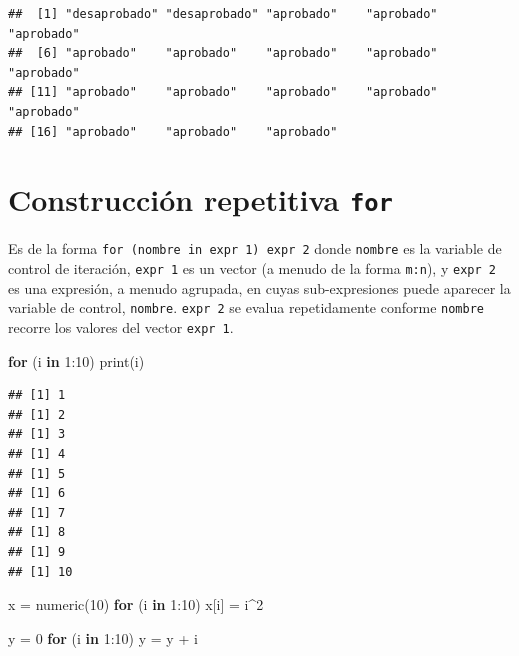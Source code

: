 \documentclass[
]{book}
\newenvironment{Shaded}{\begin{snugshade}}{\end{snugshade}}
\newcommand{\ControlFlowTok}[1]{\textcolor[rgb]{0.13,0.29,0.53}{\textbf{#1}}}
\newcommand{\DecValTok}[1]{\textcolor[rgb]{0.00,0.00,0.81}{#1}}
\newcommand{\FunctionTok}[1]{\textcolor[rgb]{0.00,0.00,0.00}{#1}}
\newcommand{\NormalTok}[1]{#1}
\newcommand{\OtherTok}[1]{\textcolor[rgb]{0.56,0.35,0.01}{#1}}
\newcommand{\SpecialCharTok}[1]{\textcolor[rgb]{0.00,0.00,0.00}{#1}}
\begin{document}
\begin{verbatim}
##  [1] "desaprobado" "desaprobado" "aprobado"    "aprobado"    "aprobado"   
##  [6] "aprobado"    "aprobado"    "aprobado"    "aprobado"    "aprobado"   
## [11] "aprobado"    "aprobado"    "aprobado"    "aprobado"    "aprobado"   
## [16] "aprobado"    "aprobado"    "aprobado"
\end{verbatim}

\hypertarget{construcciuxf3n-repetitiva-for}{%
\section{\texorpdfstring{Construcción repetitiva \texttt{for}}{Construcción repetitiva for}}\label{construcciuxf3n-repetitiva-for}}

Es de la forma \texttt{for\ (nombre\ in\ expr\ 1)\ expr\ 2} donde \texttt{nombre} es la variable de control de iteración, \texttt{expr\ 1} es un vector (a menudo de la forma \texttt{m:n}), y \texttt{expr\ 2} es una expresión, a menudo agrupada, en cuyas sub-expresiones puede aparecer la variable de control, \texttt{nombre}. \texttt{expr\ 2} se evalua repetidamente conforme \texttt{nombre} recorre los valores del vector \texttt{expr\ 1}.

\begin{Shaded}
\begin{Highlighting}[]
\ControlFlowTok{for}\NormalTok{ (i }\ControlFlowTok{in} \DecValTok{1}\SpecialCharTok{:}\DecValTok{10}\NormalTok{) }\FunctionTok{print}\NormalTok{(i)}
\end{Highlighting}
\end{Shaded}

\begin{verbatim}
## [1] 1
## [1] 2
## [1] 3
## [1] 4
## [1] 5
## [1] 6
## [1] 7
## [1] 8
## [1] 9
## [1] 10
\end{verbatim}

\begin{Shaded}
\begin{Highlighting}[]
\NormalTok{x }\OtherTok{=} \FunctionTok{numeric}\NormalTok{(}\DecValTok{10}\NormalTok{)}
\ControlFlowTok{for}\NormalTok{ (i }\ControlFlowTok{in} \DecValTok{1}\SpecialCharTok{:}\DecValTok{10}\NormalTok{) x[i] }\OtherTok{=}\NormalTok{ i}\SpecialCharTok{\^{}}\DecValTok{2}

\NormalTok{y }\OtherTok{=} \DecValTok{0}
\ControlFlowTok{for}\NormalTok{ (i }\ControlFlowTok{in} \DecValTok{1}\SpecialCharTok{:}\DecValTok{10}\NormalTok{) y }\OtherTok{=}\NormalTok{ y }\SpecialCharTok{+}\NormalTok{ i}
\end{Highlighting}
\end{Shaded}
\end{document}
